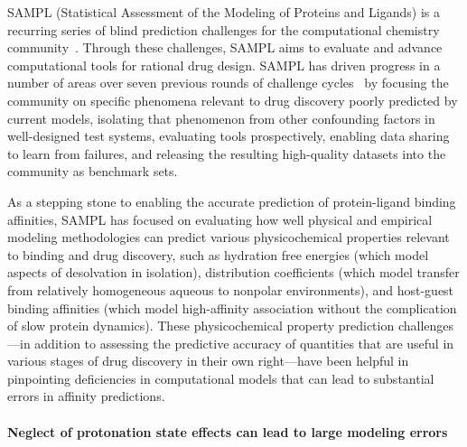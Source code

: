 \documentclass[9pt,lineno]{elife}
\begin{document}
SAMPL (Statistical Assessment of the Modeling of Proteins and Ligands) is a recurring series of blind prediction challenges for the computational chemistry community~\citep{mobley_advancing_2016, sample_D3R_website}. 
Through these challenges, SAMPL aims to evaluate and advance computational tools for rational drug design. 
SAMPL has driven progress in a number of areas over seven previous rounds of challenge cycles~\cite{nicholls_predicting_2008,guthrie_blind_2009,skillman_sampl2_2010,geballe_sampl2_2010,skillman_sampl3_2012,skillman_sampl3_2012,geballe_sampl3_2012,muddana_sampl3_2012,guthrie_sampl4_2014,Mobley:2014:JComputAidedMolDesa,muddana_sampl4_2014,mobley_blind_2014,yin_overview_2016,Bannan:2016:JComputAidedMolDes} by focusing the community on specific phenomena relevant to drug discovery poorly predicted by current models, isolating that phenomenon from other confounding factors in well-designed test systems, evaluating tools prospectively, enabling data sharing to learn from failures, and releasing the resulting high-quality datasets into the community as benchmark sets.

As a stepping stone to enabling the accurate prediction of protein-ligand binding affinities, SAMPL has focused on evaluating how well physical and empirical modeling methodologies can predict various physicochemical properties relevant to binding and drug discovery, such as hydration free energies (which model aspects of desolvation in isolation), distribution coefficients (which model transfer from relatively homogeneous aqueous to nonpolar environments), and host-guest binding affinities (which model high-affinity association without the complication of slow protein dynamics).
These physicochemical property prediction challenges---in addition to assessing the predictive accuracy of quantities that are useful in various stages of drug discovery in their own right---have been helpful in pinpointing deficiencies in computational models that can lead to substantial errors in affinity predictions. 

\paragraph{Neglect of protonation state effects can lead to large modeling errors}
\end{document}
